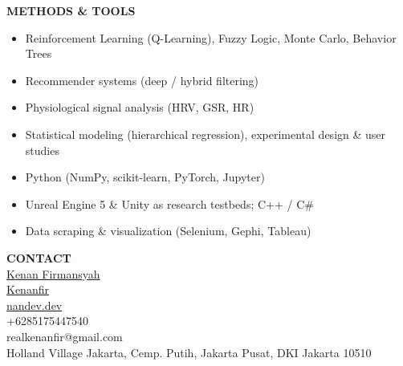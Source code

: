 \documentclass[11pt,a4paper]{article}
\newcommand{\sidesection}[1]{%
    {\large\bfseries\MakeUppercase{#1}}\\[6pt]%
}
\begin{document}
\begin{minipage}[t]{6cm}
\begin{minipage}[t]{5.5cm}
\vspace{0.7cm}

\sidesection{Methods \& Tools}

\begin{itemize}[leftmargin=*, nosep, itemsep=3pt]
    \item Reinforcement Learning (Q-Learning), Fuzzy Logic, Monte Carlo, Behavior Trees
    \item Recommender systems (deep / hybrid filtering)
    \item Physiological signal analysis (HRV, GSR, HR)
    \item Statistical modeling (hierarchical regression), experimental design \& user studies
    \item Python (NumPy, scikit-learn, PyTorch, Jupyter)
    \item Unreal Engine 5 \& Unity as research testbeds; C++ / C\#
    \item Data scraping \& visualization (Selenium, Gephi, Tableau)
\end{itemize}

\vspace{0.7cm}

\sidesection{Contact}

 \href{https://linkedin.com/in/kenanfirmansyah}{Kenan Firmansyah}\\[6pt]
 \href{https://github.com/Kenanfir}{Kenanfir}\\[6pt]
 \href{https://nandev.dev}{nandev.dev}\\[6pt]
 +6285175447540\\[6pt]
 realkenanfir@gmail.com\\[10pt]

{\small\color{lighttext}Holland Village Jakarta, Cemp. Putih, Jakarta Pusat, DKI Jakarta 10510}

\end{minipage}
\end{minipage}%
%
\end{document}
